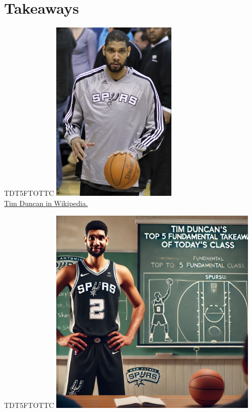 \documentclass{beamer}
\begin{document}
\section*{Takeaways}

\begin{frame}{TDT5FTOTTC}
    \centering
    \includegraphics[width=0.45\textwidth]{figures/td.jpg}\\
    \href{https://en.wikipedia.org/wiki/Tim_Duncan}{Tim Duncan in Wikipedia.}
\end{frame}

\begin{frame}{TDT5FTOTTC}
    \centering
    \includegraphics[width=0.75\textwidth]{figures/tim.png}
\end{frame}
\end{document}
